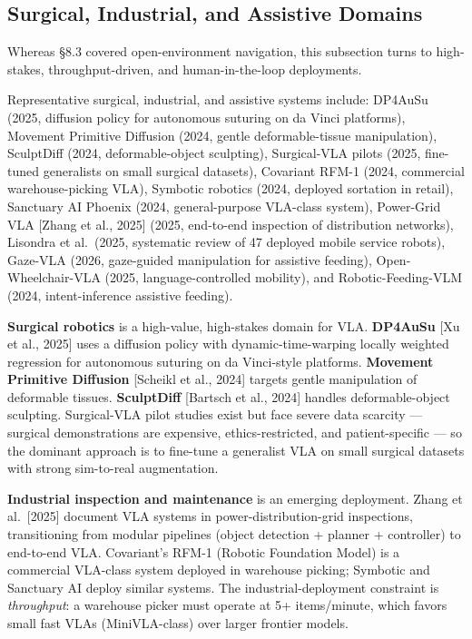 \subsection{Surgical, Industrial, and Assistive Domains}\label{surgical-industrial-and-assistive-domains}

Whereas §8.3 covered open-environment navigation, this subsection turns to high-stakes, throughput-driven, and human-in-the-loop deployments.

Representative surgical, industrial, and assistive systems include: DP4AuSu (2025, diffusion policy for autonomous suturing on da Vinci platforms), Movement Primitive Diffusion (2024, gentle deformable-tissue manipulation), SculptDiff (2024, deformable-object sculpting), Surgical-VLA pilots (2025, fine-tuned generalists on small surgical datasets), Covariant RFM-1 (2024, commercial warehouse-picking VLA), Symbotic robotics (2024, deployed sortation in retail), Sanctuary AI Phoenix (2024, general-purpose VLA-class system), Power-Grid VLA {[}Zhang et al., 2025{]} (2025, end-to-end inspection of distribution networks), Lisondra et al.~(2025, systematic review of 47 deployed mobile service robots), Gaze-VLA (2026, gaze-guided manipulation for assistive feeding), Open-Wheelchair-VLA (2025, language-controlled mobility), and Robotic-Feeding-VLM (2024, intent-inference assistive feeding).

\textbf{Surgical robotics} is a high-value, high-stakes domain for VLA. \textbf{DP4AuSu} {[}Xu et al., 2025{]} uses a diffusion policy with dynamic-time-warping locally weighted regression for autonomous suturing on da Vinci-style platforms. \textbf{Movement Primitive Diffusion} {[}Scheikl et al., 2024{]} targets gentle manipulation of deformable tissues. \textbf{SculptDiff} {[}Bartsch et al., 2024{]} handles deformable-object sculpting. Surgical-VLA pilot studies exist but face severe data scarcity --- surgical demonstrations are expensive, ethics-restricted, and patient-specific --- so the dominant approach is to fine-tune a generalist VLA on small surgical datasets with strong sim-to-real augmentation.

\textbf{Industrial inspection and maintenance} is an emerging deployment. Zhang et al.~{[}2025{]} document VLA systems in power-distribution-grid inspections, transitioning from modular pipelines (object detection + planner + controller) to end-to-end VLA. Covariant's RFM-1 (Robotic Foundation Model) is a commercial VLA-class system deployed in warehouse picking; Symbotic and Sanctuary AI deploy similar systems. The industrial-deployment constraint is \emph{throughput}: a warehouse picker must operate at 5+ items/minute, which favors small fast VLAs (MiniVLA-class) over larger frontier models.

